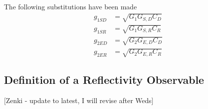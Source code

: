 \documentclass[draftcls,onecolumn]{IEEEtran}  %
\begin{document}
The following substitutions have been made
\begin{eqnarray}
	g_{1SD} &= \sqrt{G_1 G_{S,D} C_D} \label{Eq:g1sd} \\
    g_{1SR} &= \sqrt{G_1 G_{S,R} C_R} \label{Eq:g1sr} \\
    g_{2ED} &= \sqrt{G_2 G_{E,D} C_D} \label{Eq:g2ed} \\
    g_{2ER} &= \sqrt{G_2 G_{E,R} C_R} \label{Eq:g2er}
\end{eqnarray}



\subsection{Definition of a Reflectivity Observable}
 \label{sec: Observable and Forward Model}
 
 [Zenki - update to latest, I will revise after Weds]
 
\end{document}
